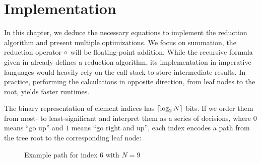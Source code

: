 \chapter{Implementation}
\label{ch:Implementation}

In this chapter, we deduce the necessary equations to implement the reduction algorithm and present multiple optimizations.
We focus on summation, the reduction operator $\operatorname{\circ}$ will be floating-point addition.
While the recursive formula given in  already defines a reduction algorithm, its implementation in imperative languages would heavily rely on the call stack to store intermediate results.
In practice, performing the calculations in opposite direction, from leaf nodes to the root, yields faster runtimes.

The binary representation of element indices has $\lceil \log_2 N \rceil$ bits.
If we order them from most- to least-significant and interpret them as a series of decisions, where $0$ means \enquote{go up} and $1$ means \enquote{go right and up}, each index encodes a path from the tree root to the corresponding leaf node:

\begin{figure}[H]
\centering
{}
\caption{Example path for index $6$ with $N = 9$}
\label{fig:indexTreePath}
\end{figure}

